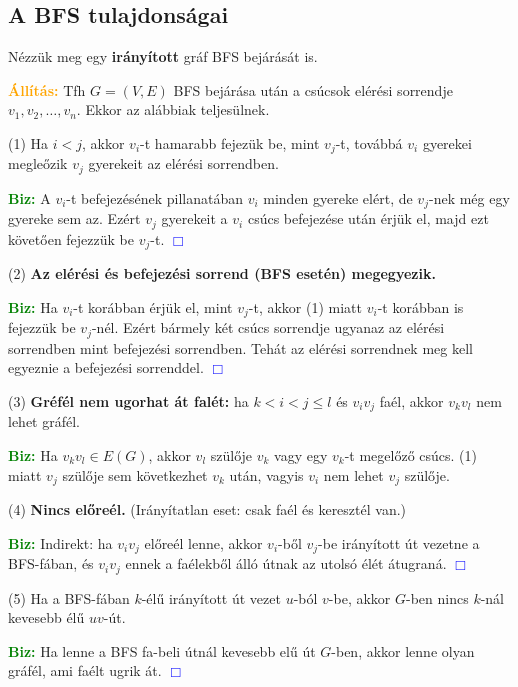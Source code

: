 \documentclass[../szamtud.tex]{subfiles}
\begin{document}
		\subsection{A BFS tulajdonságai}
			
			Nézzük meg egy \textbf{irányított} gráf BFS bejárását is.

			\textbf{\textcolor{Orange}{Állítás:}} Tfh $G=(V,E)$ BFS bejárása után a csúcsok elérési sorrendje $v_1,v_2,\dots,v_n$. Ekkor az alábbiak teljesülnek.

			(1) Ha $i < j$, akkor $v_i$-t hamarabb fejezük be, mint $v_j$-t, továbbá $v_i$ gyerekei megleőzik $v_j$ gyerekeit az elérési sorrendben.

			\textbf{\textcolor{green}{Biz:}} A $v_i$-t befejezésének pillanatában $v_i$ minden gyereke elért, de $v_j$-nek még egy gyereke sem az. Ezért $v_j$ gyerekeit a $v_i$ csúcs befejezése után érjük el, majd ezt követően fejezzük be $v_j$-t.  \textcolor{blue}{$\Box$} 

			(2) \textbf{Az elérési és befejezési sorrend (BFS esetén) megegyezik.}

			\textbf{\textcolor{green}{Biz:}} Ha $v_i$-t korábban érjük el, mint $v_j$-t, akkor (1) miatt $v_i$-t korábban is fejezzük be $v_j$-nél. Ezért bármely két csúcs sorrendje ugyanaz az elérési sorrendben mint befejezési sorrendben. Tehát az elérési sorrendnek meg kell egyeznie a befejezési sorrenddel.  \textcolor{blue}{$\Box$} 

			(3) \textbf{Gréfél nem ugorhat át falét:} ha $k < i < j \leq l$ és  $v_i v_j$ faél, akkor $v_k v_l$ nem lehet gráfél.

			\textbf{\textcolor{green}{Biz:}} Ha $v_k v_l \in E(G)$, akkor $v_l$ szülője $v_k$ vagy egy $v_k$-t megelőző csúcs. (1) miatt $v_j$ szülője sem következhet $v_k$ után, vagyis $v_i$ nem lehet $v_j$ szülője.

			(4) \textbf{Nincs előreél.} (Irányítatlan eset: csak faél és keresztél van.) 

			\textbf{\textcolor{green}{Biz:}} Indirekt: ha $v_i v_j$ előreél lenne, akkor $v_i$-ből $v_j$-be irányított út vezetne a BFS-fában, és $v_i v_j$ ennek a faélekből álló útnak az utolsó élét átugraná.  \textcolor{blue}{$\Box$} 

			(5) Ha a BFS-fában $k$-élű irányított út vezet $u$-ból $v$-be, akkor $G$-ben nincs $k$-nál kevesebb élű $uv$-út.

			\textbf{\textcolor{green}{Biz:}} Ha lenne a BFS fa-beli útnál kevesebb elű út $G$-ben, akkor lenne olyan gráfél, ami faélt ugrik át.  \textcolor{blue}{$\Box$} 
\end{document}
